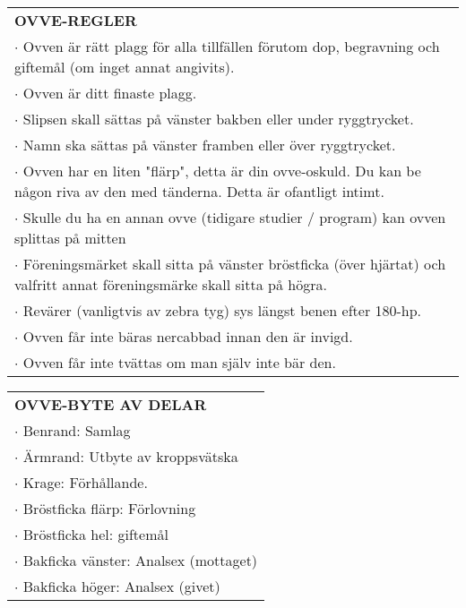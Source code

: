 \begin{tabular}{p{\textwidth}}
    \textbf{OVVE-REGLER}\\
    $\cdot$ Ovven är rätt plagg för alla tillfällen förutom dop, begravning och giftemål (om inget annat angivits).\\
    $\cdot$ Ovven är ditt finaste plagg.\\
    $\cdot$ Slipsen skall sättas på vänster bakben eller under ryggtrycket.\\
    $\cdot$ Namn ska sättas på vänster framben eller över ryggtrycket.\\
    $\cdot$ Ovven har en liten "flärp", detta är din ovve-oskuld. Du kan be någon riva av den med tänderna. Detta är ofantligt intimt.\\
    $\cdot$ Skulle du ha en annan ovve (tidigare studier / program) kan ovven splittas på mitten\\
    $\cdot$ Föreningsmärket skall sitta på vänster bröstficka (över hjärtat) och valfritt annat föreningsmärke skall sitta på högra.\\
    $\cdot$ Revärer (vanligtvis av zebra tyg) sys längst benen efter 180-hp.\\
    $\cdot$ Ovven får inte bäras nercabbad innan den är invigd.\\
    $\cdot$ Ovven får inte tvättas om man själv inte bär den.\\
\end{tabular}
\begin{tabular}{p{\textwidth}}
    \textbf{OVVE-BYTE AV DELAR} \\
    $\cdot$ Benrand: Samlag\\
    $\cdot$ Ärmrand: Utbyte av kroppsvätska\\
    $\cdot$ Krage: Förhållande.\\
    $\cdot$ Bröstficka flärp: Förlovning \\
    $\cdot$ Bröstficka hel: giftemål\\
    $\cdot$ Bakficka vänster: Analsex (mottaget)\\
    $\cdot$ Bakficka höger: Analsex (givet)\\
\end{tabular}




\newpage